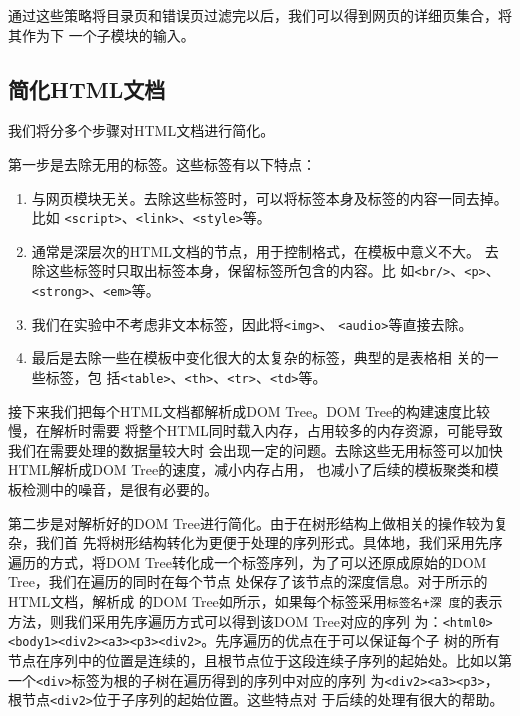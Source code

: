 通过这些策略将目录页和错误页过滤完以后，我们可以得到网页的详细页集合，将其作为下
一个子模块的输入。
\subsection{简化HTML文档}
我们将分多个步骤对HTML文档进行简化。

第一步是去除无用的标签。这些标签有以下特点：
\begin{enumerate}
 \item\label{item:1} 与网页模块无关。去除这些标签时，可以将标签本身及标签的内容一同去掉。比如
  \texttt{<script>}、\texttt{<link>}、\texttt{<style>}等。
\item\label{item:2} 通常是深层次的HTML文档的节点，用于控制格式，在模板中意义不大。
  去除这些标签时只取出标签本身，保留标签所包含的内容。比
  如\texttt{<br/>}、\texttt{<p>}、\texttt{<strong>}、\texttt{<em>}等。
\item\label{item:3} 我们在实验中不考虑非文本标签，因此将\texttt{<img>}、
  \texttt{<audio>}等直接去除。
\item\label{item:4} 最后是去除一些在模板中变化很大的太复杂的标签，典型的是表格相
  关的一些标签，包
  括\texttt{<table>}、\texttt{<th>}、\texttt{<tr>}、\texttt{<td>}等。
\end{enumerate}

接下来我们把每个HTML文档都解析成DOM Tree。DOM Tree的构建速度比较慢，在解析时需要
将整个HTML同时载入内存，占用较多的内存资源，可能导致我们在需要处理的数据量较大时
会出现一定的问题。去除这些无用标签可以加快HTML解析成DOM Tree的速度，减小内存占用，
也减小了后续的模板聚类和模板检测中的噪音，是很有必要的。

第二步是对解析好的DOM Tree进行简化。由于在树形结构上做相关的操作较为复杂，我们首
先将树形结构转化为更便于处理的序列形式。具体地，我们采用先序遍历的方式，将DOM
Tree转化成一个标签序列，为了可以还原成原始的DOM Tree，我们在遍历的同时在每个节点
处保存了该节点的深度信息。对于所示的HTML文档，解析成
的DOM Tree如所示，如果每个标签采用\texttt{标签名+深
  度}的表示方法，则我们采用先序遍历方式可以得到该DOM Tree对应的序列
为：\texttt{<html0><body1><div2><a3><p3><div2>}。先序遍历的优点在于可以保证每个子
树的所有节点在序列中的位置是连续的，且根节点位于这段连续子序列的起始处。比如以第
一个\texttt{<div>}标签为根的子树在遍历得到的序列中对应的序列
为\texttt{<div2><a3><p3>}，根节点\texttt{<div2>}位于子序列的起始位置。这些特点对
于后续的处理有很大的帮助。

